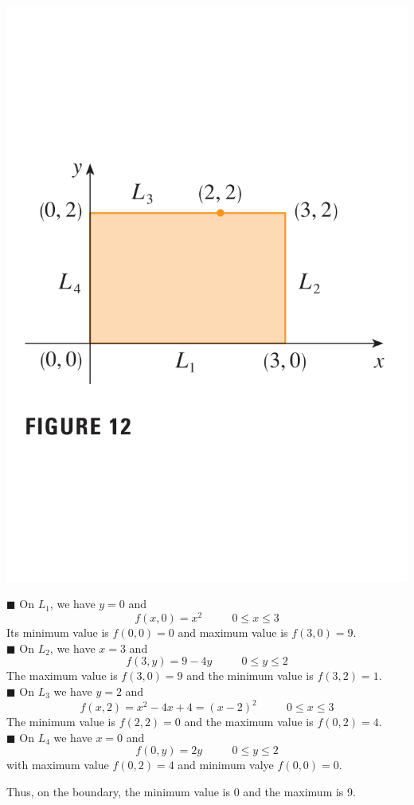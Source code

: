 \documentclass{article}
\begin{document}
\begin{minipage}[]{0.3\linewidth}
  \includegraphics[width = 4.3 cm]{./images/rec12.png}
  
\end{minipage}
\begin{minipage}[]{0.67\linewidth}
 
\textcolor{blue5}{\small $\blacksquare$} On $L_1$, we have $y = 0 $ and 
\[f(x,0) = x^2 \quad \text{ } \quad 0 \le x \le 3 \]
Its minimum value is $f(0,0) = 0$ and maximum value is $f(3,0) = 9$.\\
\textcolor{blue5}{\small $\blacksquare$} On $L_2$, we have $x = 3$ and  
\[f(3, y) = 9  - 4y \quad \text{ } \quad 0 \le y \le 2   \]
The maximum value is $f(3,0) = 9 $ and the minimum value is $f(3,2) = 1$.\\
\textcolor{blue5}{\small $\blacksquare$} On $L_3$ we have $y = 2$ and 
\[f(x,2) = x^2 - 4x + 4 = (x- 2) ^2 \quad \text{ } \quad 0 \le x \le 3\]
The minimum value is $f(2,2) = 0$ and the maximum value is $f(0,2) = 4$.\\
\textcolor{blue5}{\small $\blacksquare$} On $L_4$ we have $x = 0$ and 
\[f(0,y) = 2y \quad \text{ } \quad 0 \le y \le 2 \]
with maximum value $f(0,2) = 4$ and minimum valye $f(0,0) = 0$.

Thus, on the boundary, the minimum value is 0 and the maximum is 9.

\end{minipage}
\end{document}
